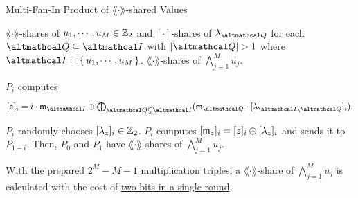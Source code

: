 \documentclass[../240906_cryptlab_flute.tex]{subfiles}
\begin{document}
\begin{frame}{Multi-Fan-In Product of \(\lang\cdot\rang\)-shared Values}
    \begin{block}{}
        \begin{description}[Output]
            \ii[Input]
            \(\lang\cdot\rang\)-shares of \(u_1, \cdots, u_M \in \mathbb{Z}_2\) and \([\cdot]\)-shares of
            \(\lambda_{\mcal{Q}}\) for each \(\mcal{Q} \subseteq \mcal{I}\)
            with \(|\mcal{Q}| > 1\) where \(\mcal{I} = \{\,u_1, \cdots, u_M\,\}\).
            \ii[Output]
            \(\lang\cdot\rang\)-shares of \(\bigwedge_{j=1}^M u_j\).
        \end{description}
        \pause
        \begin{enumerate}
            \ii
            \(P_i\) computes
            \centerline{\(
                [z]_i = i \cdot \msf{m}_{\mcal{I}}
                \oplus \bigoplus_{\mcal{Q} \subsetneq \mcal{I}} (\msf{m}_{\mcal{Q}}
                \cdot [\lambda_{\mcal{I} \setminus \mcal{Q}}]_i).
            \)}
            \pause
            \ii
            \(P_i\) randomly chooses \([\lambda_z]_i \in \mathbb{Z}_2\).
            \ii
            \(P_i\) computes \([\mathsf{m}_z]_i = [z]_i \oplus [\lambda_z]_i\)
            and sends it to \(P_{1-i}\).
            \ii
            Then, \(P_0\) and \(P_1\) have \(\lang\cdot\rang\)-shares of \(\bigwedge_{j=1}^M u_j\).
        \end{enumerate}
        \pause
        With the prepared \(2^M - M - 1\) multiplication triples,
        a \(\lang\cdot\rang\)-share of \(\bigwedge_{j=1}^M u_j\)
        is calculated with the cost of \ul{two bits in a single round}.
    \end{block}
\end{frame}
\end{document}
